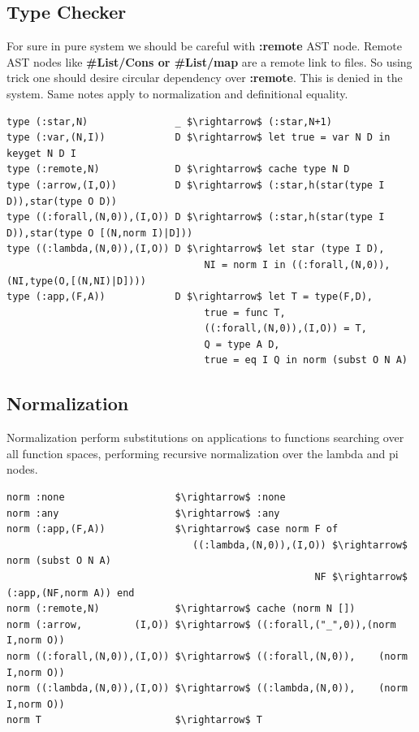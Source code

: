 \documentclass[11pt,oneside]{article}
\begin{document}
\subsection{Type Checker}

For sure in pure system we should be careful with {\bf :remote} AST node. Remote
AST nodes like {\bf \#List/Cons or \#List/map} are a remote link to files. So using
trick one should desire circular dependency over {\bf :remote}. This is denied in
the system. Same notes apply to normalization and definitional equality.

\begin{lstlisting}[mathescape=true]
type (:star,N)               _ $\rightarrow$ (:star,N+1)
type (:var,(N,I))            D $\rightarrow$ let true = var N D in keyget N D I
type (:remote,N)             D $\rightarrow$ cache type N D
type (:arrow,(I,O))          D $\rightarrow$ (:star,h(star(type I D)),star(type O D))
type ((:forall,(N,0)),(I,O)) D $\rightarrow$ (:star,h(star(type I D)),star(type O [(N,norm I)|D]))
type ((:lambda,(N,0)),(I,O)) D $\rightarrow$ let star (type I D),
                                  NI = norm I in ((:forall,(N,0)),(NI,type(O,[(N,NI)|D])))
type (:app,(F,A))            D $\rightarrow$ let T = type(F,D),
                                  true = func T,
                                  ((:forall,(N,0)),(I,O)) = T,
                                  Q = type A D,
                                  true = eq I Q in norm (subst O N A)
\end{lstlisting}

\subsection{Normalization}

Normalization perform substitutions on applications to functions searching
over all function spaces, performing recursive normalization over the lambda and pi nodes.

\begin{lstlisting}[mathescape=true]
norm :none                   $\rightarrow$ :none
norm :any                    $\rightarrow$ :any
norm (:app,(F,A))            $\rightarrow$ case norm F of
                                ((:lambda,(N,0)),(I,O)) $\rightarrow$ norm (subst O N A)
                                                     NF $\rightarrow$ (:app,(NF,norm A)) end
norm (:remote,N)             $\rightarrow$ cache (norm N [])
norm (:arrow,         (I,O)) $\rightarrow$ ((:forall,("_",0)),(norm I,norm O))
norm ((:forall,(N,0)),(I,O)) $\rightarrow$ ((:forall,(N,0)),    (norm I,norm O))
norm ((:lambda,(N,0)),(I,O)) $\rightarrow$ ((:lambda,(N,0)),    (norm I,norm O))
norm T                       $\rightarrow$ T
\end{lstlisting}
\end{document}
